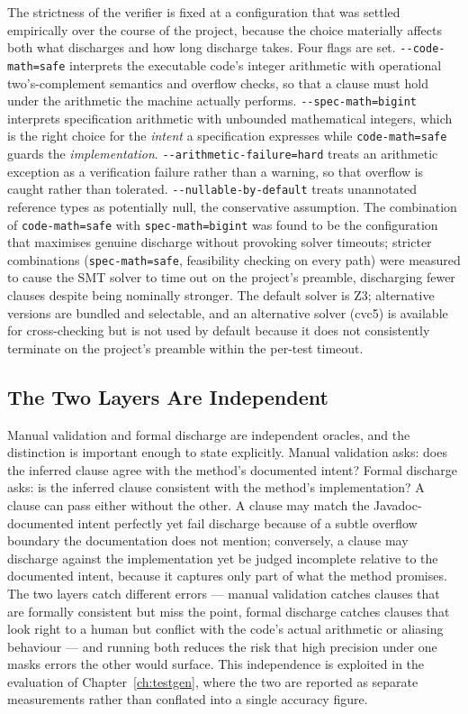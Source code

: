 The strictness of the verifier is fixed at a configuration that was settled
empirically over the course of the project, because the choice materially
affects both what discharges and how long discharge takes. Four flags are set.
\texttt{-{}-code-math=safe} interprets the executable code's integer arithmetic
with operational two's-complement semantics and overflow checks, so that a
clause must hold under the arithmetic the machine actually performs.
\texttt{-{}-spec-math=bigint} interprets specification arithmetic with unbounded
mathematical integers, which is the right choice for the \emph{intent} a
specification expresses while \texttt{code-math=safe} guards the
\emph{implementation}. \texttt{-{}-arithmetic-failure=hard} treats an
arithmetic exception as a verification failure rather than a warning, so that
overflow is caught rather than tolerated. \texttt{-{}-nullable-by-default}
treats unannotated reference types as potentially null, the conservative
assumption. The combination of \texttt{code-math=safe} with
\texttt{spec-math=bigint} was found to be the configuration that maximises
genuine discharge without provoking solver timeouts; stricter combinations
(\texttt{spec-math=safe}, feasibility checking on every path) were measured to
cause the SMT solver to time out on the project's preamble, discharging fewer
clauses despite being nominally stronger. The default solver is Z3; alternative
versions are bundled and selectable, and an alternative solver (cvc5) is
available for cross-checking but is not used by default because it does not
consistently terminate on the project's preamble within the per-test timeout.

\subsection{The Two Layers Are Independent}

Manual validation and formal discharge are independent oracles, and the
distinction is important enough to state explicitly. Manual validation asks:
does the inferred clause agree with the method's documented intent? Formal
discharge asks: is the inferred clause consistent with the method's
implementation? A clause can pass either without the other. A clause may match
the Javadoc-documented intent perfectly yet fail discharge because of a subtle
overflow boundary the documentation does not mention; conversely, a clause may
discharge against the implementation yet be judged incomplete relative to the
documented intent, because it captures only part of what the method promises.
The two layers catch different errors --- manual validation catches
clauses that are formally consistent but miss the point, formal discharge
catches clauses that look right to a human but conflict with the code's actual
arithmetic or aliasing behaviour --- and running both reduces the risk that
high precision under one masks errors the other would surface. This independence
is exploited in the evaluation of Chapter~\ref{ch:testgen}, where the two are
reported as separate measurements rather than conflated into a single accuracy
figure.


